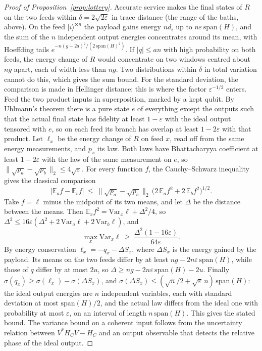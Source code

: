 \documentclass[11pt]{article}
\theoremstyle{definition}
\theoremstyle{remark}
\begin{document}
\begin{proof}[Proof of Proposition~\ref{prop:lottery}]
Accurate service makes the final states of $R$ on the two feeds within $\delta=2\sqrt{2\varepsilon}$ in trace distance (the range of the baths, above). On the feed $|i\rangle^{\otimes n}$ the payload gains energy $nd_i$ up to $n\varepsilon\,\mathrm{span}(H)$, and the sum of the $n$ independent output energies concentrates around its mean, with Hoeffding tails $e^{-n(g-2a)^2/(2\,\mathrm{span}(H)^2)}$. If $|q|\le an$ with high probability on both feeds, the energy change of $R$ would concentrate on two windows centred about $ng$ apart, each of width less than $ng$. Two distributions within $\delta$ in total variation cannot do this, which gives the sum bound. For the standard deviation, the comparison is made in Hellinger distance; this is where the factor $\varepsilon^{-1/2}$ enters. Feed the two product inputs in superposition, marked by a kept qubit. By Uhlmann's theorem there is a pure state $e$ of everything except the outputs such that the actual final state has fidelity at least $1-\varepsilon$ with the ideal output tensored with $e$, so on each feed its branch has overlap at least $1-2\varepsilon$ with that product. Let $\ell_x$ be the energy change of $R$ on feed $x$, read off from the same energy measurements, and $p_x$ its law. Both laws have Bhattacharyya coefficient at least $1-2\varepsilon$ with the law of the same measurement on $e$, so $\|\sqrt{p_a}-\sqrt{p_b}\|_2\le4\sqrt\varepsilon$. For every function $f$, the Cauchy--Schwarz inequality gives the classical comparison
\[
|\mathbb E_af-\mathbb E_bf|\ \le\ \|\sqrt{p_a}-\sqrt{p_b}\|_2\,\bigl(2\,\mathbb E_af^2+2\,\mathbb E_bf^2\bigr)^{1/2}.
\]
Take $f=\ell$ minus the midpoint of its two means, and let $\Delta$ be the distance between the means. Then $\mathbb E_xf^2=\mathrm{Var}_x\ell+\Delta^2/4$, so $\Delta^2\le16\varepsilon(\Delta^2+2\,\mathrm{Var}_a\ell+2\,\mathrm{Var}_b\ell)$, and
\[
\max_x\mathrm{Var}_x\ell\ \ge\ \frac{\Delta^2(1-16\varepsilon)}{64\varepsilon}.
\]
By energy conservation $\ell_x=-q_x-\Delta S_x$, where $\Delta S_x$ is the energy gained by the payload. Its means on the two feeds differ by at least $ng-2n\varepsilon\,\mathrm{span}(H)$, while those of $q$ differ by at most $2u$, so $\Delta\ge ng-2n\varepsilon\,\mathrm{span}(H)-2u$. Finally $\sigma(q_x)\ge\sigma(\ell_x)-\sigma(\Delta S_x)$, and $\sigma(\Delta S_x)\le(\sqrt n/2+\sqrt\varepsilon\,n)\,\mathrm{span}(H)$: the ideal output energies are $n$ independent variables, each with standard deviation at most $\mathrm{span}(H)/2$, and the actual law differs from the ideal one with probability at most $\varepsilon$, on an interval of length $n\,\mathrm{span}(H)$. This gives the stated bound. The variance bound on a coherent input follows from the uncertainty relation between $V^*H_CV-H_C$ and an output observable that detects the relative phase of the ideal output.
\end{proof}
\end{document}
